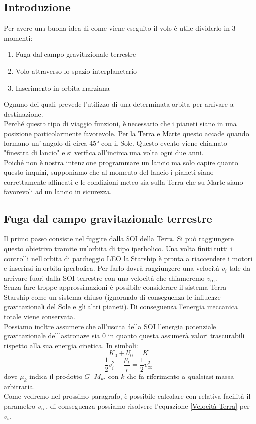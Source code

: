 \subsection{Introduzione}
Per avere una buona idea di come viene eseguito il volo è utile dividerlo in 3 momenti:
\begin{enumerate}
    \item Fuga dal campo gravitazionale terrestre
    \item Volo attraverso lo spazio interplanetario
    \item Inserimento in orbita marziana
\end{enumerate}
Ognuno dei quali prevede l'utilizzo di una determinata orbita per arrivare a destinazione.\\
Perché questo tipo di viaggio funzioni, è necessario che i pianeti siano in una posizione particolarmente favorevole. Per la Terra e Marte questo accade quando formano un' angolo di circa 45° con il Sole. Questo evento viene chiamato "finestra di lancio" e si verifica all'incirca una volta ogni due anni.\\
Poiché non è nostra intenzione programmare un lancio ma solo capire quanto questo inquini, supponiamo che al momento del lancio i pianeti siano correttamente allineati e le condizioni meteo sia sulla Terra che su Marte siano favorevoli ad un lancio in sicurezza.
\subsection{Fuga dal campo gravitazionale terrestre}
Il primo passo consiste nel fuggire dalla SOI della Terra. Si può raggiungere questo obiettivo tramite un'orbita di tipo iperbolico.
Una volta finiti tutti i controlli nell'orbita di parcheggio LEO la Starship è pronta a riaccendere i motori e inserirsi in orbita iperbolica.
Per farlo dovrà raggiungere una velocità $v_i$ tale da arrivare fuori dalla SOI terrestre con una velocità che chiameremo $v_\infty$.\\
Senza fare troppe approssimazioni è possibile considerare il sistema Terra-Starship come un sistema chiuso (ignorando di conseguenza le influenze gravitazionali del Sole e gli altri pianeti). Di conseguenza l'energia meccanica totale viene conservata.\\
Possiamo inoltre assumere che all'uscita della SOI l'energia potenziale gravitazionale dell'astronave sia 0 in quanto questa assumerà valori trascurabili rispetto alla sua energia cinetica. In simboli:
$$K_0 + U_0 = K$$
\begin{equation}
    \label{Velocità Terra}
    \frac{1}{2}v_i^2 - \frac{\mu_t}{r} = \frac{1}{2}v_{\infty}^2
\end{equation}
dove $\mu_k$ indica il prodotto $G \cdot M_k$, con $k$ che fa riferimento a qualsiasi massa arbitraria.\\
Come vedremo nel prossimo paragrafo, è possibile calcolare con relativa facilità il parametro $v_\infty$, di conseguenza possiamo risolvere l'equazione \ref{Velocità Terra} per $v_i$.


